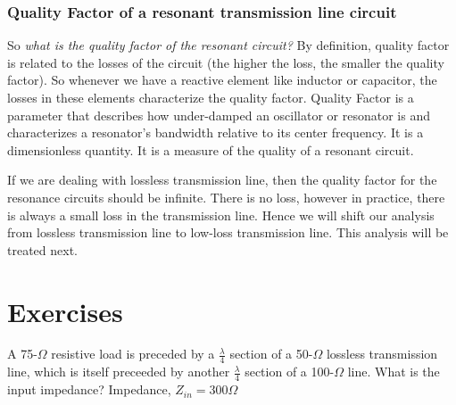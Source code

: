 \subsubsection{Quality Factor of a resonant transmission line circuit}
So \emph{what is the quality factor of the resonant circuit?} By definition, quality factor is related to the losses of the circuit (the higher the loss, the smaller the quality factor). So whenever we have a reactive element like inductor or capacitor, the losses in these elements characterize the quality factor. Quality Factor is a parameter that describes how under-damped an oscillator or resonator is and characterizes a resonator's bandwidth relative to its center frequency. It is a dimensionless quantity. It is a measure of the quality of a resonant circuit. 

If we are dealing with lossless transmission line, then the quality factor for the resonance circuits should be infinite. There is no loss, however in practice, there is always a small loss in the transmission line. Hence we will shift our analysis from lossless transmission line to low-loss transmission line. This analysis will be treated next.

\section*{Exercises}
\begin{ExerciseList}
\Exercise[label={ex101}]
A 75-$\varOmega$ resistive load is preceded by a $\frac{\lambda}{4}$ section of a 50-$\varOmega$ lossless transmission line, which is itself preceeded by another $\frac{\lambda}{4}$ section of a 100-$\varOmega$ line. What is the input impedance?
\Answer
Impedance, $Z_{in} = 300\varOmega$
\end{ExerciseList}
